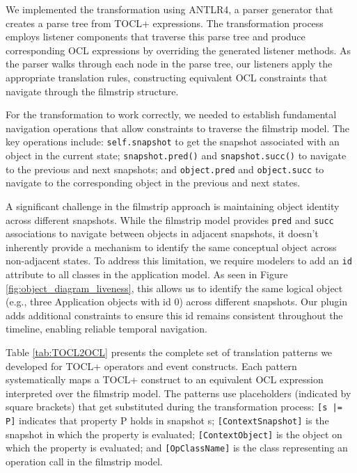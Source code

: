 We implemented the transformation using ANTLR4, a parser generator that creates a 
parse tree from TOCL+ expressions. The transformation process employs listener 
components that traverse this parse tree and produce corresponding OCL expressions 
by overriding the generated listener methods. As the parser walks through each node 
in the parse tree, our listeners apply the appropriate translation rules, constructing 
equivalent OCL constraints that navigate through the filmstrip structure.

For the transformation to work correctly, we needed to establish fundamental 
navigation operations that allow constraints to traverse the filmstrip model. 
The key operations include: \texttt{self.snapshot} to get the snapshot associated 
with an object in the current state; \texttt{snapshot.pred()} and 
\texttt{snapshot.succ()} to navigate to the previous and next snapshots; and 
\texttt{object.pred} and \texttt{object.succ} to navigate to the corresponding 
object in the previous and next states.

A significant challenge in the filmstrip approach is maintaining object identity 
across different snapshots. While the filmstrip model provides \texttt{pred} and 
\texttt{succ} associations to navigate between objects in adjacent snapshots, it 
doesn't inherently provide a mechanism to identify the same conceptual object across 
non-adjacent states. To address this limitation, we require modelers to add an 
\texttt{id} attribute to all classes in the application model. As seen in Figure 
\ref{fig:object_diagram_liveness}, this allows us to identify the same logical 
object (e.g., three Application objects with id 0) across different snapshots. 
Our plugin adds additional constraints to ensure this id remains consistent 
throughout the timeline, enabling reliable temporal navigation.

Table \ref{tab:TOCL2OCL} presents the complete set of translation patterns we developed for TOCL+ operators and event constructs. Each pattern systematically maps a TOCL+ construct to an equivalent OCL expression interpreted over the filmstrip model. The patterns use placeholders (indicated by square brackets) that get substituted during the transformation process: \texttt{[s |= P]} indicates that property P holds in snapshot s; \texttt{[ContextSnapshot]} is the snapshot in which the property is evaluated; \texttt{[ContextObject]} is the object on which the property is evaluated; and \texttt{[OpClassName]} is the class representing an operation call in the filmstrip model.

